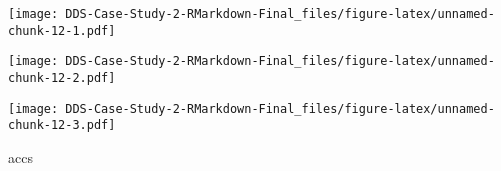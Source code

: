 \documentclass[]{article}
\newenvironment{Shaded}{\begin{snugshade}}{\end{snugshade}}
\newcommand{\DataTypeTok}[1]{\textcolor[rgb]{0.13,0.29,0.53}{#1}}
\newcommand{\KeywordTok}[1]{\textcolor[rgb]{0.13,0.29,0.53}{\textbf{#1}}}
\newcommand{\NormalTok}[1]{#1}
\newcommand{\OperatorTok}[1]{\textcolor[rgb]{0.81,0.36,0.00}{\textbf{#1}}}
\newcommand{\StringTok}[1]{\textcolor[rgb]{0.31,0.60,0.02}{#1}}
\begin{document}
\texttt{[image: DDS-Case-Study-2-RMarkdown-Final\_files/figure-latex/unnamed-chunk-12-1.pdf]}

\begin{Shaded}
\end{Shaded}

\texttt{[image: DDS-Case-Study-2-RMarkdown-Final\_files/figure-latex/unnamed-chunk-12-2.pdf]}

\begin{Shaded}
\end{Shaded}

\texttt{[image: DDS-Case-Study-2-RMarkdown-Final\_files/figure-latex/unnamed-chunk-12-3.pdf]}

\begin{Shaded}
\begin{Highlighting}[]
\NormalTok{accs}
\end{Highlighting}
\end{Shaded}
\end{document}
